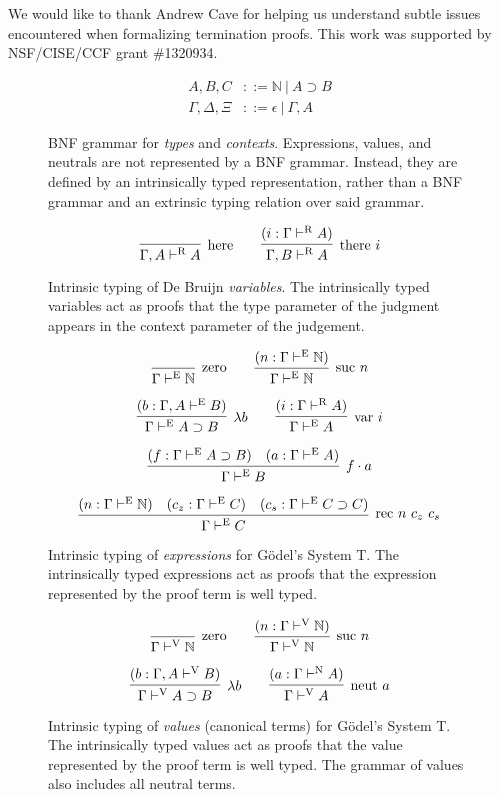 \documentclass[preprint,nonatbib]{sigplanconf}
\numberwithin{subdefin}{defin}
\numberwithin{subtheorem}{theorem}
\def\arr{\supset}
\def\app{\cdot}
\def\lam{\lambda}
\def\nat{\mathbb{N}}
\newcommand{\turn}[1]{\vdash^\con{#1}}
\newcommand{\con}[1]{\textmd{#1}}
\newcommand{\fun}[1]{\textmd{#1}}
\newcommand{\type}[1]{\Gamma \turn{E} #1}
\newcommand{\ctype}[2]{\Gamma , #1 \turn{E} #2}
\newcommand{\typv}[1]{\Gamma \turn{V} #1}
\newcommand{\ctypv}[2]{\Gamma , #1 \turn{V} #2}
\newcommand{\typn}[1]{\Gamma \turn{N} #1}
\newcommand{\typr}[1]{\Gamma \turn{R} #1}
\newcommand{\ctypr}[2]{\Gamma , #1 \turn{R} #2}
\begin{document}
\acks

We would like to thank Andrew Cave for helping us understand subtle
issues encountered when formalizing termination proofs.
This work was supported by NSF/CISE/CCF grant \#1320934.




\appendix
\clearpage

\begin{figure}
\caption{
BNF grammar for {\it types} and {\it contexts}. 
Expressions, values, and neutrals
are not represented by a BNF grammar. Instead, they are defined by
an intrinsically typed representation, rather than a BNF grammar and
an extrinsic typing relation over said grammar.
}
\begin{align*}
A, B, C &::= \nat ~ | ~ A \arr B \\
\Gamma, \Delta, \Xi &::= \epsilon ~ | ~ \Gamma , A
\end{align*}
\label{fig:gram}
\end{figure}

\begin{figure}
\caption{
Intrinsic typing of De Bruijn {\it variables}.
The intrinsically typed variables act as proofs that the type
parameter of the judgment appears in the context parameter of the
judgement.
}
$$
\infer
  [\con{here}]
  {\ctypr{A}{A}}
{
}
\qquad
\infer
  [\con{there} ~ i]
  {\ctypr{B}{A}}
{
  (i : \typr{A})
}
$$
\label{fig:typr}
\end{figure}

\begin{figure}
\caption{
Intrinsic typing of {\it expressions} for G{\"o}del's System T. The
intrinsically typed expressions act as proofs that the expression
represented by the proof term is well typed.
}
$$
\infer
  [\con{zero}]
  {\type{\nat}}
{}
\qquad
\infer
  [\con{suc} ~ n]
  {\type{\nat}}
{
  (n : \type{\nat})
}
$$

$$
\infer
  [\lam b]
  {\type{A \arr B}}
{
  (b : \ctype{A}{B})
}
\qquad
\infer
  [\fun{var} ~ i]
  {\type{A}}
{
  (i : \typr{A})
}
$$

$$
\infer
  [f \app a]
  {\type{B}}
{
  (f : \type{A \arr B})
  &
  (a : \type{A})
}
$$

$$
\infer
  [\fun{rec} ~ n ~ c_z ~ c_s]
  {\type{C}}
{
  (n : \type{\nat})
  &
  (c_z : \type{C})
  &
  (c_s : \type{C \arr C})
}
$$
\label{fig:type}
\end{figure}

\begin{figure}
\caption{
Intrinsic typing of {\it values} (canonical terms) for G{\"o}del's System T.
The intrinsically typed values act as proofs that the value
represented by the proof term is well typed. The grammar of values
also includes all neutral terms.
}
$$
\infer
  [\con{zero}]
  {\typv{\nat}}
{}
\qquad
\infer
  [\con{suc} ~ n]
  {\typv{\nat}}
{
  (n : \typv{\nat})
}
$$

$$
\infer
  [\lam b]
  {\typv{A \arr B}}
{
  (b : \ctypv{A}{B})
}
\qquad
\infer
  [\fun{neut} ~ a]
  {\typv{A}}
{
  (a : \typn{A})
}
$$
\label{fig:typv}
\end{figure}
\end{document}
